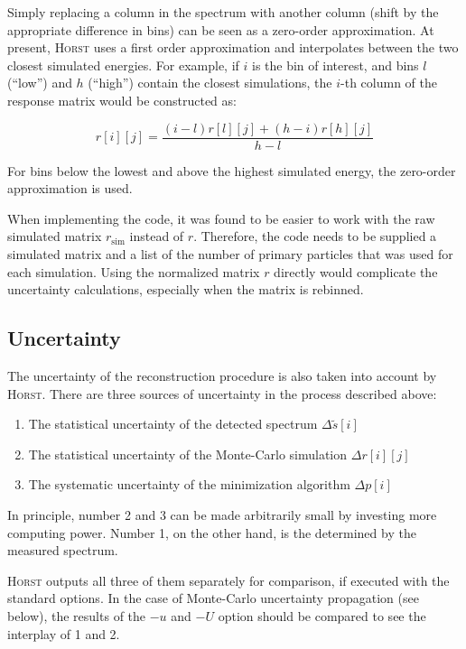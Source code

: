 \documentclass{article}
\begin{document}
Simply replacing a column in the spectrum with another column (shift by the appropriate difference in bins) can be seen as a zero-order approximation.
At present, \textsc{Horst} uses a first order approximation and interpolates between the two closest simulated energies.
For example, if $i$ is the bin of interest, and bins $l$ (``low'') and $h$ (``high'') contain the closest simulations, the $i$-th column of the response matrix would be constructed as:

\begin{equation}
	\label{interpolation}
	r[i][j] = \frac{(i-l) r[l][j] + (h-i) r[h][j]}{h-l}
\end{equation}

\noindent For bins below the lowest and above the highest simulated energy, the zero-order approximation is used.

\noindent When implementing the code, it was found to be easier to work with the raw simulated matrix $r_\mathrm{sim}$ instead of $r$.
Therefore, the code needs to be supplied a simulated matrix and a list of the number of primary particles that was used for each simulation.
Using the normalized matrix $r$ directly would complicate the uncertainty calculations, especially when the matrix is rebinned.

\subsection{Uncertainty}
\label{Uncertainty}

The uncertainty of the reconstruction procedure is also taken into account by \textsc{Horst}.
There are three sources of uncertainty in the process described above:

\begin{enumerate}
	\item The statistical uncertainty of the detected spectrum $\Delta \tilde{s}[i]$
	\item The statistical uncertainty of the Monte-Carlo simulation $\Delta r[i][j]$
	\item The systematic uncertainty of the minimization algorithm $\Delta p[i]$
\end{enumerate}

\noindent In principle, number 2 and 3 can be made arbitrarily small by investing more computing power. 
Number 1, on the other hand, is the determined by the measured spectrum.

\noindent \textsc{Horst} outputs all three of them separately for comparison, if executed with the standard options.
In the case of Monte-Carlo uncertainty propagation (see below), the results of the $-u$ and $-U$ option should be compared to see the interplay of 1 and 2.
\end{document}
